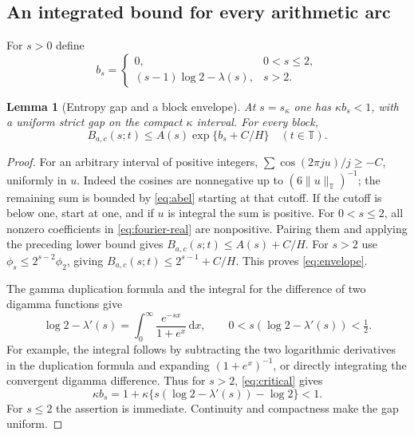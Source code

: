 \documentclass[11pt]{article}
\newtheorem{lemma}[theorem]{Lemma}
\theoremstyle{definition}\newtheorem{definition}[theorem]{Definition}
\theoremstyle{remark}\newtheorem{remark}[theorem]{Remark}
\newcommand{\T}{\mathbb T}\newcommand{\R}{\mathbb R}\newcommand{\C}{\mathbb C}
\newcommand{\dd}{\,\mathrm d}\newcommand{\ind}{\mathbf1}
\numberwithin{equation}{section}\allowdisplaybreaks
\begin{document}
\subsection{An integrated bound for every arithmetic arc}
For $s>0$ define
\begin{equation}\label{eq:bs}
 b_s=\begin{cases}0,&0<s\le2,\\
 (s-1)\log2-\lambda(s),&s>2.
 \end{cases}
\end{equation}
\begin{lemma}[Entropy gap and a block envelope]\label{lem:entropy}
At $s=s_\kappa$ one has $\kappa b_s<1$, with a uniform strict gap on
the compact $\kappa$ interval. For every block,
\begin{equation}\label{eq:envelope}
 B_{a,c}(s;t)\le A(s)\exp\{b_s+C/H\}\quad(t\in\T).
\end{equation}
\end{lemma}
\begin{proof}
For an arbitrary interval of positive integers,
$\sum\cos(2\pi ju)/j\ge-C$, uniformly in $u$. Indeed the cosines are
nonnegative up to $(6\|u\|_\T)^{-1}$; the remaining sum is bounded by
\eqref{eq:abel} starting at that cutoff. If the cutoff is below one,
start at one, and if $u$ is integral the sum is positive.
For $0<s\le2$, all nonzero coefficients in \eqref{eq:fourier-real} are
nonpositive. Pairing them and applying the preceding lower bound gives
$B_{a,c}(s;t)\le A(s)+C/H$. For $s>2$ use
$\phi_s\le2^{s-2}\phi_2$, giving $B_{a,c}(s;t)\le2^{s-1}+C/H$.
This proves \eqref{eq:envelope}.

The gamma duplication formula and the integral for the difference of two
digamma functions give
\[
 \log2-\lambda'(s)=\int_0^\infty\frac{e^{-sx}}{1+e^x}\dd x,
 \qquad 0<s(\log2-\lambda'(s))<\tfrac12.
\]
For example, the integral follows by subtracting the two logarithmic
derivatives in the duplication formula and expanding
$(1+e^x)^{-1}$, or directly integrating the convergent digamma difference.
Thus for $s>2$, \eqref{eq:critical} gives
\[
 \kappa b_s=1+\kappa\{s(\log2-\lambda'(s))-\log2\}<1.
\]
For $s\le2$ the assertion is immediate. Continuity and compactness make
the gap uniform.
\end{proof}
\end{document}
